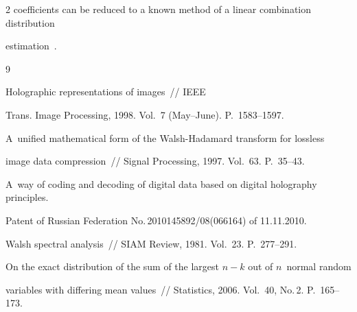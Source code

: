 \begin{multicols}{2}
coefficients can be reduced to a known method of a linear combination distribution

estimation~\cite{7-fr}.







{\small\frenchspacing

{%


\begin{thebibliography}{9}









Holographic representations of images~// IEEE

Trans. Image Processing, 1998. Vol.~7 (May--June). P.~1583--1597.



A~unified mathematical form of the Walsh-Hadamard transform for lossless

image data compression~// Signal Processing, 1997. Vol.~63. P.~35--43.





A~way of coding and decoding of digital data based on digital holography principles.

Patent of Russian Federation No.\,2010145892/08(066164) of 11.11.2010.





Walsh spectral analysis~//  SIAM Review, 1981. Vol.~23. P.~277--291.





On the exact distribution of the sum of the largest $n-k$ out of $n$~normal random 

variables with differing mean values~//  Statistics, 2006. Vol.~40, No.\,2. P.~165--173.




\end{thebibliography}}}
\end{multicols}
